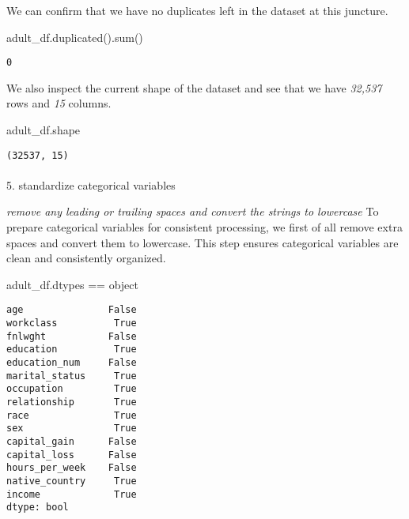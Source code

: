 \documentclass[
  letterpaper,
  DIV=11,
  numbers=noendperiod]{scrartcl}
\makeatletter
\let\oldparagraph\paragraph
\renewcommand{\paragraph}{
    \@ifstar
      \xxxParagraphStar
      \xxxParagraphNoStar
  }
\newcommand{\xxxParagraphStar}[1]{\oldparagraph*{#1}\mbox{}}
\newcommand{\xxxParagraphNoStar}[1]{\oldparagraph{#1}\mbox{}}
\newenvironment{Shaded}{\begin{snugshade}}{\end{snugshade}}
\newcommand{\BuiltInTok}[1]{\textcolor[rgb]{0.00,0.23,0.31}{#1}}
\newcommand{\NormalTok}[1]{\textcolor[rgb]{0.00,0.23,0.31}{#1}}
\newcommand{\OperatorTok}[1]{\textcolor[rgb]{0.37,0.37,0.37}{#1}}
\makeatother
\begin{document}
We can confirm that we have no duplicates left in the dataset at this
juncture.

\begin{Shaded}
\begin{Highlighting}[]
\NormalTok{adult\_df.duplicated().}\BuiltInTok{sum}\NormalTok{()}
\end{Highlighting}
\end{Shaded}

\begin{verbatim}
0
\end{verbatim}

We also inspect the current shape of the dataset and see that we have
\emph{32,537} rows and \emph{15} columns.

\begin{Shaded}
\begin{Highlighting}[]
\NormalTok{adult\_df.shape}
\end{Highlighting}
\end{Shaded}

\begin{verbatim}
(32537, 15)
\end{verbatim}

\paragraph{5. standardize categorical
variables}\label{standardize-categorical-variables}

\emph{remove any leading or trailing spaces and convert the strings to
lowercase} To prepare categorical variables for consistent processing,
we first of all remove extra spaces and convert them to lowercase. This
step ensures categorical variables are clean and consistently organized.

\begin{Shaded}
\begin{Highlighting}[]
\NormalTok{adult\_df.dtypes }\OperatorTok{==} \BuiltInTok{object}
\end{Highlighting}
\end{Shaded}

\begin{verbatim}
age               False
workclass          True
fnlwght           False
education          True
education_num     False
marital_status     True
occupation         True
relationship       True
race               True
sex                True
capital_gain      False
capital_loss      False
hours_per_week    False
native_country     True
income             True
dtype: bool
\end{verbatim}
\end{document}
